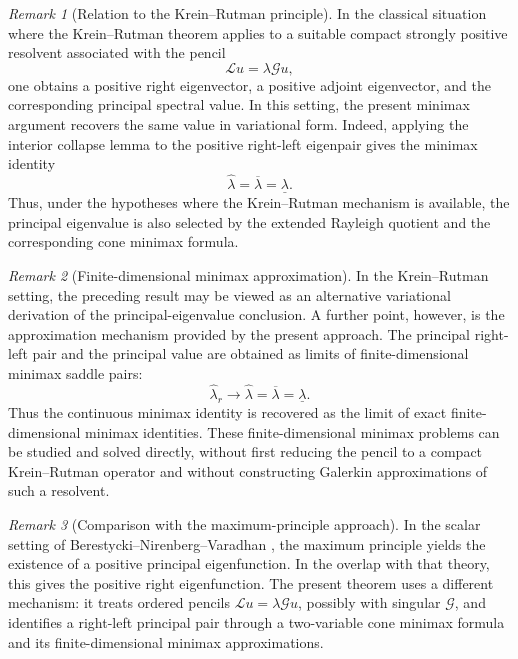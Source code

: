 \documentclass[preprint,10pt]{elsarticle}
\theoremstyle{plain}
\theoremstyle{definition}
\theoremstyle{remark}
\newtheorem{remark}{Remark}
\begin{document}
\begin{remark}[Relation to the Krein--Rutman principle]
	In the classical situation where the Krein--Rutman theorem applies to a
	suitable compact strongly positive resolvent associated with the pencil
	\[
	\mathcal L u=\lambda\mathcal G u,
	\]
	one obtains a positive right eigenvector, a positive adjoint eigenvector,
	and the corresponding principal spectral value. In this setting, the
	present minimax argument recovers the same value in variational form.
	Indeed, applying the interior collapse lemma to the positive right-left
	eigenpair gives the minimax identity
	\[
	\hat\lambda
	=
	\overline\lambda
	=
	\underline\lambda .
	\]
	Thus, under the hypotheses where the Krein--Rutman mechanism is available,
	the principal eigenvalue is also selected by the extended Rayleigh quotient
	and the corresponding cone minimax formula.
\end{remark}

\begin{remark}[Finite-dimensional minimax approximation]
	In the Krein--Rutman setting, the preceding result may be viewed as an
	alternative variational derivation of the principal-eigenvalue conclusion.
	A further point, however, is the approximation mechanism provided by the
	present approach. The principal right-left pair and the principal value are
	obtained as limits of finite-dimensional minimax saddle pairs:
	\[
	\hat\lambda_r
	\longrightarrow
	\hat\lambda
	=
	\overline\lambda
	=
	\underline\lambda .
	\]
	Thus the continuous minimax identity is recovered as the limit of exact
	finite-dimensional minimax identities. These finite-dimensional minimax
	problems can be studied and solved directly, without first reducing the
	pencil to a compact Krein--Rutman operator and without constructing
	Galerkin approximations of such a resolvent.
\end{remark}

\begin{remark}[Comparison with the maximum-principle approach]
	In the scalar setting of Berestycki--Nirenberg--Varadhan
	\cite{BerestNienbVardan}, the maximum principle yields the existence of a
	positive principal eigenfunction. In the overlap with that theory, this
	gives the positive right eigenfunction. The present theorem uses a different
	mechanism: it treats ordered pencils
	\(\mathcal L u=\lambda\mathcal G u\), possibly with singular \(\mathcal G\),
	and identifies a right-left principal pair through a two-variable cone
	minimax formula and its finite-dimensional minimax approximations.
\end{remark}
\end{document}

